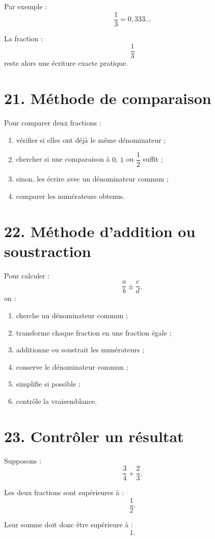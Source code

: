 Par exemple :
\[
\dfrac13=0{,}333\ldots
\]

La fraction :
\[
\dfrac13
\]
reste alors une écriture exacte pratique.

\section{21. Méthode de comparaison}

\begin{methode}
Pour comparer deux fractions :
\begin{enumerate}
\item vérifier si elles ont déjà le même dénominateur ;
\item chercher si une comparaison à $0$, $1$ ou $\dfrac12$ suffit ;
\item sinon, les écrire avec un dénominateur commun ;
\item comparer les numérateurs obtenus.
\end{enumerate}
\end{methode}

\section{22. Méthode d'addition ou soustraction}

\begin{methode}
Pour calculer :
\[
\dfrac ab\pm\dfrac cd,
\]
on :
\begin{enumerate}
\item cherche un dénominateur commun ;
\item transforme chaque fraction en une fraction égale ;
\item additionne ou soustrait les numérateurs ;
\item conserve le dénominateur commun ;
\item simplifie si possible ;
\item contrôle la vraisemblance.
\end{enumerate}
\end{methode}

\section{23. Contrôler un résultat}

Supposons :
\[
\dfrac34+\dfrac23.
\]

Les deux fractions sont supérieures à :
\[
\dfrac12.
\]

Leur somme doit donc être supérieure à :
\[
1.
\]

